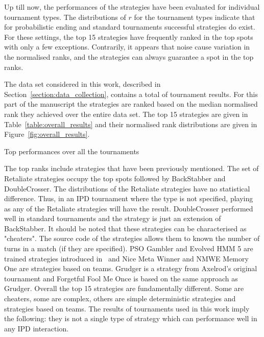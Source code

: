 Up till now, the performances of the \numberofstrategies strategies have been evaluated for
individual tournament types. The distributions of \(r\) for the tournament types indicate that
for probabilistic ending and standard tournaments successful strategies do exist.
For these settings, the top 15 strategies have frequently ranked in
the top spots with only a few exceptions. Contrarily, it appears that noise
cause variation in the normalised ranks, and the strategies can always guarantee
a spot in the top ranks.

The data set considered in this work, described in
Section~\ref{section:data_collection}, contains a total of \numberofalltournaments
tournament results. For this part of the manuscript the strategies are ranked
based on the median normalised rank they achieved over the entire data set.
The top 15 strategies are given in Table~\ref{table:overall_results}
and their normalised rank distributions are given in Figure~\ref{fig:overall_results}.

\begin{table}[!htbp]
    \centering
    \resizebox{.35\textwidth}{!}{
    }
    \caption{Top performances over all the tournaments}\label{table:overall_results}
\end{table}

The top ranks include strategies that have been previously mentioned. The
set of Retaliate strategies occupy the top spots followed by BackStabber
and DoubleCrosser. The distributions of the Retaliate strategies have no
statistical difference. Thus, in an IPD tournament where the type is not
specified, playing as any of the Retaliate strategies will have the result.
DoubleCrosser performed well in standard tournaments and the
strategy is just an extension of BackStabber. It should be noted that these
strategies can be characterised as "cheaters". The source code of the strategies
allows them to known the number of turns in a match (if they are specified).
PSO Gambler and Evolved HMM 5 are
trained strategies introduced in~\cite{Harper2017} and Nice Meta Winner and NMWE
Memory One are strategies based on teams. Grudger is a strategy from Axelrod's
original tournament and Forgetful Fool Me Once is based on the same approach as
Grudger. Overall the top 15 strategies are fundamentally different. Some are cheaters,
some are complex, others are simple deterministic strategies and strategies based
on teams. The results of \numberofalltournaments tournaments used in this work imply the following:
they is not a single type of strategy which can performance well in any IPD interaction.

